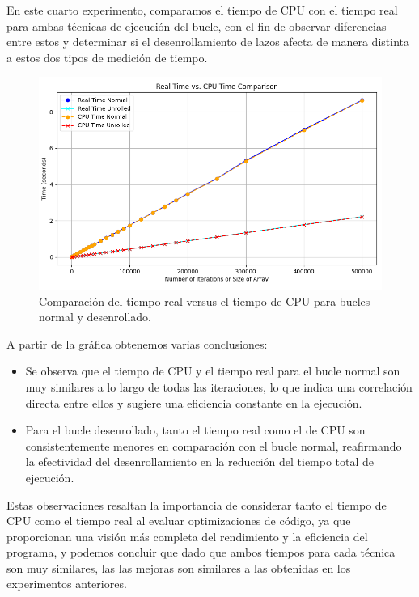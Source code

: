 \documentclass[a4paper,twocolumn]{article}
\begin{document}
En este cuarto experimento, comparamos el tiempo de CPU con el tiempo real para ambas técnicas de ejecución del bucle, con el fin de observar diferencias entre estos y determinar si el desenrollamiento de lazos afecta de manera distinta a estos dos tipos de medición de tiempo.

\begin{figure}[H]
    \centering
    \includegraphics[width=\columnwidth]{img/times.png}
    \caption{Comparación del tiempo real versus el tiempo de CPU para bucles normal y desenrollado.}
    \label{fig:real_vs_cpu_time}
\end{figure}

A partir de la gráfica obtenemos varias conclusiones:

\begin{itemize}
    \item Se observa que el tiempo de CPU y el tiempo real para el bucle normal son muy similares a lo largo de todas las iteraciones, lo que indica una correlación directa entre ellos y sugiere una eficiencia constante en la ejecución.
    \item Para el bucle desenrollado, tanto el tiempo real como el de CPU son consistentemente menores en comparación con el bucle normal, reafirmando la efectividad del desenrollamiento en la reducción del tiempo total de ejecución.
\end{itemize}

Estas observaciones resaltan la importancia de considerar tanto el tiempo de CPU como el tiempo real al evaluar optimizaciones de código, ya que proporcionan una visión más completa del rendimiento y la eficiencia del programa, y podemos concluir que dado que ambos tiempos para cada técnica son muy similares, las las mejoras son similares a las obtenidas en los experimentos anteriores.
\end{document}
